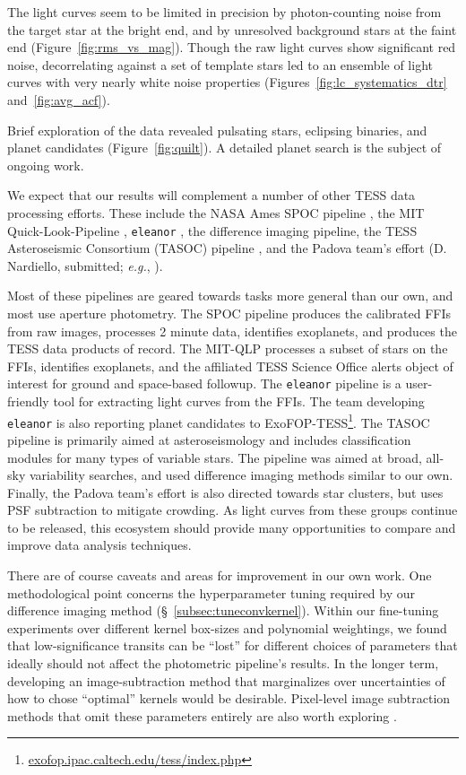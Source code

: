 \documentclass[12pt,twocolumn,tighten,trackchanges]{aastex62}
\begin{document}
The light curves seem to be limited in precision by photon-counting
noise from the target star at the bright end, and by unresolved
background stars at the faint end (Figure~\ref{fig:rms_vs_mag}).
Though the raw light curves show significant red noise, decorrelating
against a set of template stars led to an ensemble of light curves
with very nearly white noise properties
(Figures~\ref{fig:lc_systematics_dtr} and~\ref{fig:avg_acf}).

Brief exploration of the data revealed pulsating stars, eclipsing
binaries, and planet candidates (Figure~\ref{fig:quilt}).  A detailed
planet search is the subject of ongoing work.

We expect that our results will complement a number of other TESS data
processing efforts.  These include the NASA Ames SPOC pipeline
\citep{jenkins_spoc_2010}, the MIT Quick-Look-Pipeline
\citep{huang_tess_2018}, \texttt{eleanor}
\citep{feinstein_eleanor_2019}, the \citet{oelkers_precision_2018}
difference imaging pipeline, the TESS Asteroseismic Consortium (TASOC)
pipeline \citep{lund_k2p_2015,handberg_tess_2019}, and the Padova
team's effort (D{.} Nardiello, submitted; {\it e.g.},
\citealt{libralato_psf-based_2016}). 

Most of these pipelines are geared towards tasks more general than our
own, and most use aperture photometry.  The SPOC pipeline produces the
calibrated FFIs from raw images, processes 2 minute data, identifies
exoplanets, and produces the TESS data products of record.  The
MIT-QLP processes a subset of stars on the FFIs, identifies
exoplanets, and the affiliated TESS Science Office alerts object of
interest for ground and space-based followup.  The \texttt{eleanor}
pipeline is a user-friendly tool for extracting light curves from the
FFIs.  The team developing \texttt{eleanor} is also reporting planet
candidates to
ExoFOP-TESS\footnote{\url{exofop.ipac.caltech.edu/tess/index.php}}.
The TASOC pipeline is primarily aimed at asteroseismology and includes
classification modules for many types of variable stars. The
\citeauthor{oelkers_precision_2018} pipeline was aimed at broad,
all-sky variability searches, and used difference imaging methods
similar to our own.  Finally, the Padova team's effort is also
directed towards star clusters, but uses PSF subtraction to mitigate
crowding.  As light curves from these groups continue to be released,
this ecosystem should provide many opportunities to compare and
improve data analysis techniques. 

There are of course caveats and areas for improvement in our own work.
One methodological point concerns the hyperparameter tuning required
by our difference imaging method (\S~\ref{subsec:tuneconvkernel}).
Within our fine-tuning experiments over different kernel box-sizes and
polynomial weightings, we found that low-significance transits  can be
``lost'' for different choices of parameters that ideally should not
affect the photometric pipeline's results.  In the longer term,
developing an image-subtraction method that marginalizes over
uncertainties of how to chose ``optimal'' kernels would be desirable.
Pixel-level image subtraction methods that omit these parameters
entirely are also worth exploring \citep{wang_pixel-level_2017}.
\end{document}
